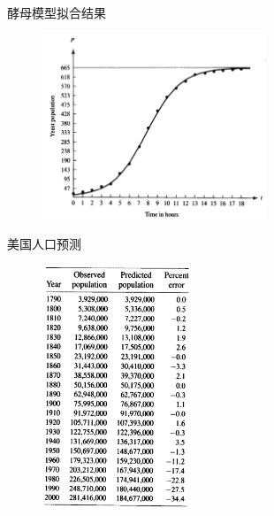 \documentclass[UTF8]{ctexbeamer}
\begin{document}
\begin{frame}{酵母模型拟合结果}
  \begin{figure}
    \centering
    \includegraphics[width=0.6\textwidth]{yf.png}
  \end{figure}
\end{frame}

\begin{frame}{美国人口预测}
  \begin{figure}
    \centering
    \includegraphics[width=0.4\textwidth]{ap.png}
  \end{figure}
  
\end{frame}
\end{document}
